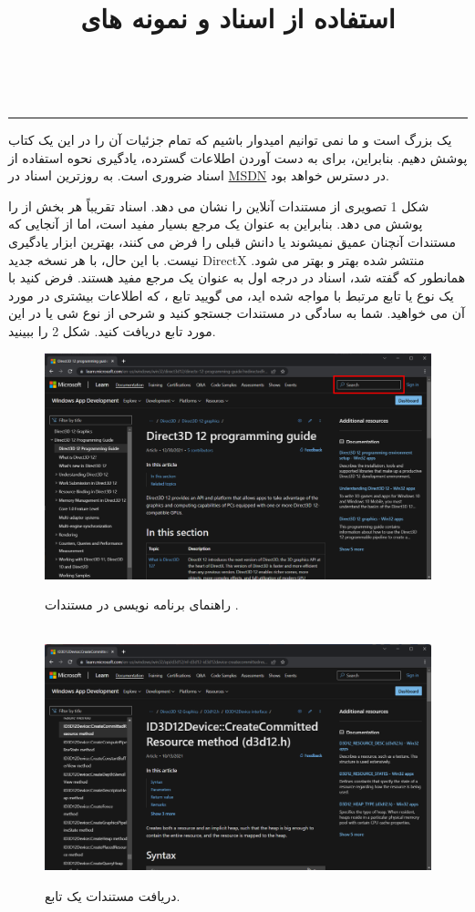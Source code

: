     \newpage
    \title{
        \LARGE
        \textbf{استفاده از اسناد  و نمونه های }
    }
    \\ \rule{\textwidth}{0.5pt}
    {\large
     یک  بزرگ است و ما نمی توانیم امیدوار باشیم که تمام جزئیات آن را در این یک کتاب پوشش دهیم.
    بنابراین، برای به دست آوردن اطلاعات گسترده، یادگیری نحوه استفاده از اسناد  ضروری است.
    به روزترین اسناد در \href{https://msdn.microsoft.com/en-us/library/windows/desktop/dn899121%28v=vs.85%29.aspx}{MSDN}
    در دسترس خواهد بود.

    شکل 1 تصویری از مستندات آنلاین را نشان می دهد.
    اسناد  تقریباً هر بخش از  را پوشش می دهد.
    بنابراین به عنوان یک مرجع بسیار مفید است، اما از آنجایی که مستندات آنچنان عمیق نمیشوند یا دانش قبلی را فرض می کنند، بهترین ابزار یادگیری نیست. با این حال، با هر نسخه جدید DirectX منتشر شده بهتر و بهتر می شود.
    همانطور که گفته شد، اسناد در درجه اول به عنوان یک مرجع مفید هستند.
    فرض کنید با یک نوع یا تابع مرتبط با  مواجه شده اید، می گویید تابع ، که اطلاعات بیشتری در مورد آن می خواهید.
    شما به سادگی در مستندات جستجو کنید و شرحی از نوع شی یا در این مورد تابع دریافت کنید. شکل 2 را ببینید.
        \begin{figure}[H]
            \centering
            \setlength{\belowcaptionskip}{-10pt}
            \includegraphics[width=\textwidth]{Images/1.Intro.1.1.png}
            \caption{راهنمای برنامه نویسی  در مستندات .}
            \\[20pt]
            \includegraphics[width=\textwidth]{Images/1.Intro.1.2.png}
            \caption{دریافت مستندات یک تابع.}
        \end{figure}

}
